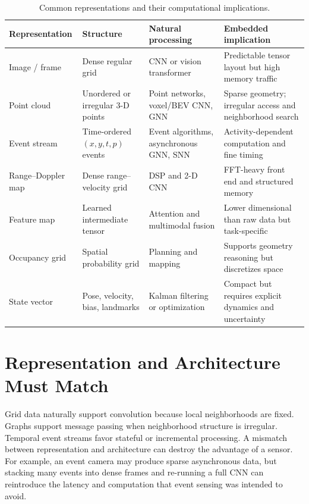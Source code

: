 \begin{table}[H]
\centering
\caption{Common representations and their computational implications.}
\label{tab:representations}
\begin{tabularx}{\textwidth}{@{}p{2.7cm}p{3.1cm}X X@{}}
\toprule
\textbf{Representation} & \textbf{Structure} & \textbf{Natural processing} & \textbf{Embedded implication} \\
\midrule
Image / frame & Dense regular grid & CNN or vision transformer & Predictable tensor layout but high memory traffic \\
Point cloud & Unordered or irregular 3-D points & Point networks, voxel/BEV CNN, GNN & Sparse geometry; irregular access and neighborhood search \\
Event stream & Time-ordered \((x,y,t,p)\) events & Event algorithms, asynchronous GNN, SNN & Activity-dependent computation and fine timing \\
Range--Doppler map & Dense range--velocity grid & DSP and 2-D CNN & FFT-heavy front end and structured memory \\
Feature map & Learned intermediate tensor & Attention and multimodal fusion & Lower dimensional than raw data but task-specific \\
Occupancy grid & Spatial probability grid & Planning and mapping & Supports geometry reasoning but discretizes space \\
State vector & Pose, velocity, bias, landmarks & Kalman filtering or optimization & Compact but requires explicit dynamics and uncertainty \\
\bottomrule
\end{tabularx}
\end{table}

\section{Representation and Architecture Must Match}

Grid data naturally support convolution because local neighborhoods are fixed. Graphs support message passing when neighborhood structure is irregular. Temporal event streams favor stateful or incremental processing. A mismatch between representation and architecture can destroy the advantage of a sensor. For example, an event camera may produce sparse asynchronous data, but stacking many events into dense frames and re-running a full CNN can reintroduce the latency and computation that event sensing was intended to avoid.

